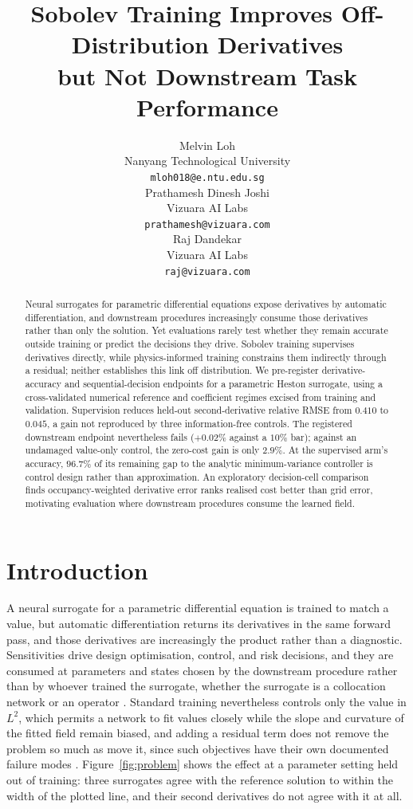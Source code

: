 \documentclass{article}
\title{Sobolev Training Improves Off-Distribution Derivatives\\
but Not Downstream Task Performance}
\author{%
  Melvin Loh \\
  Nanyang Technological University \\
  \texttt{mloh018@e.ntu.edu.sg} \\
  \And
  Prathamesh Dinesh Joshi \\
  Vizuara AI Labs \\
  \texttt{prathamesh@vizuara.com} \\
  \And
  Raj Dandekar \\
  Vizuara AI Labs \\
  \texttt{raj@vizuara.com} \\
}
\begin{document}
\maketitle

\begin{abstract}
Neural surrogates for parametric differential equations expose derivatives by automatic differentiation, and
downstream procedures increasingly consume those derivatives rather than only the solution. Yet evaluations rarely
test whether they remain accurate outside training or predict the decisions they drive.
Sobolev training supervises derivatives directly, while physics-informed training constrains
them indirectly through a residual; neither establishes this link off distribution. We pre-register
derivative-accuracy and sequential-decision endpoints for a parametric Heston surrogate, using a
cross-validated numerical reference and coefficient regimes excised from training and validation.
Supervision reduces held-out second-derivative relative RMSE from $0.410$ to
$0.045$, a gain not reproduced by three information-free controls. The registered downstream
endpoint nevertheless fails ($+0.02\%$ against a $10\%$ bar); against an undamaged
value-only control, the zero-cost gain is only $2.9\%$. At the supervised arm's accuracy,
$96.7\%$ of its remaining gap to the analytic minimum-variance
controller is control design rather than approximation.
An exploratory decision-cell comparison finds occupancy-weighted
derivative error ranks realised cost better than grid error, motivating evaluation
where downstream procedures consume the learned field.
\end{abstract}

\section{Introduction}
\label{sec:intro}

A neural surrogate for a parametric differential equation is trained to match a
value, but automatic differentiation returns its derivatives in the same forward
pass, and those derivatives are increasingly the product rather than a
diagnostic. Sensitivities drive design optimisation, control, and risk
decisions, and they are consumed at parameters and states chosen by the
downstream procedure rather than by whoever trained the surrogate, whether the
surrogate is a collocation network \citep{raissi2019physics} or an operator
\citep{lu2021learning}. Standard
training nevertheless controls only the value in $L^{2}$, which permits a network
to fit values closely while the slope and curvature of the fitted field remain
biased, and adding a residual term does not remove the problem so much as move it,
since such objectives have their own documented failure modes
\citep{krishnapriyan2021characterizing}. Figure~\ref{fig:problem} shows the effect at a parameter setting held out
of training: three surrogates agree with the reference solution to within the
width of the plotted line, and their second derivatives do not agree with it at
all.
\end{document}
